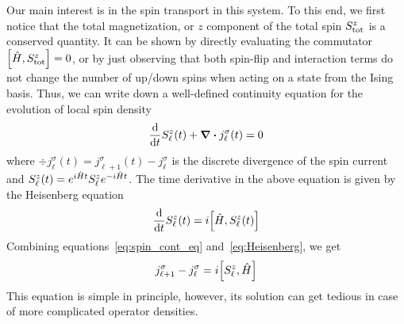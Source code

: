Our main interest is in the spin transport in this system. To this end, we first notice that
the total magnetization, or \(z\) component of the total spin \(S^{z}_{\mathrm{tot}}\)
is a conserved quantity.
It can be shown by directly evaluating the commutator \(\comm{\hat{H} }{\Sz_{\mathrm{tot}}}=0\), or by just observing
that both spin-flip and interaction terms do not change the number of up/down spins when acting on a state
from the Ising basis. Thus, we can write down a well-defined continuity equation for the evolution
of local spin density
\begin{equation}
    \dv{t} S^{z}_{\ell}(t) + \div{j^{\sigma}_{\ell}(t)} = 0
    \label{eq:spin_cont_eq}
\end{equation}
where \(\div{j^{\sigma}_{\ell}(t)} = j^{\sigma}_{\ell+1}(t) - j^{\sigma}_{\ell}\) is the
discrete divergence of the spin current and \(S^{z}_{\ell}(t) = e^{i \hat{H}  t} S^{z}_{\ell} e^{-i \hat{H}  t}\).
The time derivative in the above equation is given by the Heisenberg equation
\begin{equation}
    \dv{t} \Sz_{\ell}(t) = i \comm{\hat{H} }{\Sz_{\ell}(t)}
    \label{eq:Heisenberg}
\end{equation}
Combining equations~\eqref{eq:spin_cont_eq} and~\eqref{eq:Heisenberg}, we get
\begin{equation}
    j^{\sigma}_{\ell+1} - j^{\sigma}_{\ell} = i\comm{\Sz_{\ell}}{\hat{H} }
\end{equation}
This equation is simple in principle, however, its solution can get tedious in case of more complicated
operator densities.

